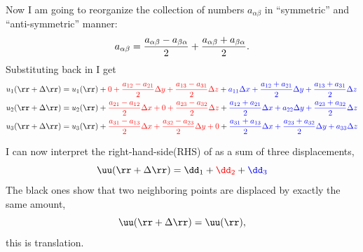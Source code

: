 \documentclass{tufte-book} %
\begin{document}
\begin{fullwidth}
Now I am going to reorganize the collection of numbers
$a_{\alpha\beta}$ in ``symmetric'' and ``anti-symmetric'' manner: 
\begin{equation}
a_{\alpha\beta} = \frac{a_{\alpha\beta}-a_{\beta\alpha}}{2} +
  \frac{a_{\alpha\beta}+a_{\beta\alpha}}{2}  \/.
\label{eq:break}
\end{equation}
Substituting  back in  I get
\begin{subequations}
\begin{align}
u_1(\rr+\Delta \rr) &= u_1(\rr) + 
   {\color{red}0 + \frac{a_{12}-a_{21}}{2}\Delta y +
    \frac{a_{13}-a_{31}}{2}\Delta z}  +
       {\color{blue}a_{11}\Delta x+ \frac{a_{12}+a_{21}}{2}\Delta y +
    \frac{a_{13}+a_{31}}{2}\Delta z}\\
u_2(\rr+\Delta \rr) &= u_2(\rr) + 
   {\color{red}\frac{a_{21}-a_{12}}{2}\Delta x + 0 +
    \frac{a_{23}-a_{32}}{2}\Delta z}  +
       {\color{blue}\frac{a_{12}+a_{21}}{2}\Delta x+ a_{22}\Delta y +
    \frac{a_{23}+a_{32}}{2}\Delta z}\\
u_3(\rr+\Delta \rr) &= u_3(\rr) + 
   {\color{red}\frac{a_{31}-a_{13}}{2}\Delta x +
    \frac{a_{32}-a_{23}}{2}\Delta y+ 0}  +
       {\color{blue}\frac{a_{31}+a_{13}}{2}\Delta x+ 
    \frac{a_{23}+a_{32}}{2}\Delta y + a_{33}\Delta z}
\end{align}
\label{eq:u123}
\end{subequations}
\end{fullwidth}
I can now interpret the right-hand-side(RHS) of  
as a sum of three displacements, 
\begin{equation}
\uu(\rr+\Delta \rr) = \dd_1+{\color{red}\dd_2}+{\color{blue}\dd_3}
\label{eq:disp}
\end{equation}
The black ones show that two neighboring points are
displaced by exactly the same amount, 
\begin{equation}
\uu(\rr+\Delta \rr) = \uu(\rr) \/,
\end{equation}
this is translation. 
\end{document}

